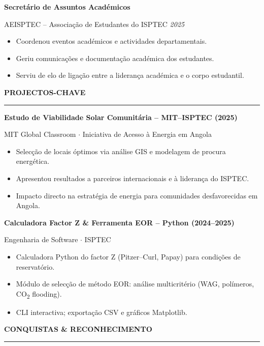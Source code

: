 \documentclass[10pt,a4paper]{article}
\renewcommand{\textbf}[1]{{\bfseries\color{cvgold}#1}}
\newcommand{\mainSection}[1]{%
  \vspace{1pt}%
  {\bfseries\color{cvgold}\large\MakeUppercase{#1}}%
  \par\vspace{0pt}%
  {\color{cvgold}\rule{\linewidth}{0.9pt}}%
  \par\vspace{1pt}%
}
\newcommand{\expEntry}[3]{%
  {\bfseries\color{cvgold}\normalsize #1}\par\vspace{1pt}%
  {\color{cvmuted}\small #2 \hfill \textit{\color{cvgoldlt}#3}}\par\vspace{1pt}%
}
\begin{document}
\begin{minipage}[t]{\dimexpr 0.705\paperwidth - 26pt}
  \vspace{2pt}
  \expEntry{Secretário de Assuntos Académicos}%
           {AEISPTEC -- Associação de Estudantes do ISPTEC}%
           {2025}
  \begin{itemize}
    \item Coordenou eventos académicos e actividades departamentais.
    \item Geriu comunicações e documentação académica dos estudantes.
    \item Serviu de elo de ligação entre a liderança académica e o corpo estudantil.
  \end{itemize}

  \mainSection{Projectos-Chave}

  \textbf{Estudo de Viabilidade Solar Comunitária -- MIT–ISPTEC (2025)}\par
  {\color{cvgoldlt}\small MIT Global Classroom $\cdot$ Iniciativa de Acesso à Energia em Angola}
  \begin{itemize}
    \item Selecção de locais óptimos via análise GIS e modelagem de procura energética.
    \item Apresentou resultados a parceiros internacionais e à liderança do ISPTEC.
    \item Impacto directo na estratégia de energia para comunidades desfavorecidas em Angola.
  \end{itemize}

  \vspace{2pt}
  \textbf{Calculadora Factor Z \& Ferramenta EOR -- Python (2024–2025)}\par
  {\color{cvgoldlt}\small Engenharia de Software $\cdot$ ISPTEC}
  \begin{itemize}
    \item Calculadora Python do factor Z (Pitzer–Curl, Papay) para condições de reservatório.
    \item Módulo de selecção de método EOR: análise multicritério (WAG, polímeros, CO\textsubscript{2} flooding).
    \item CLI interactiva; exportação CSV e gráficos Matplotlib.
  \end{itemize}

  \mainSection{Conquistas \& Reconhecimento}


\end{minipage}
\end{document}
